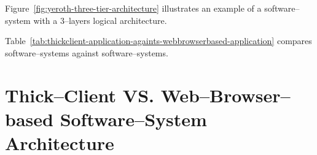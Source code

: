 Figure~\ref{fig:yeroth-three-tier-architecture}
illustrates an example of a \webbrowserbased
software--system with a $3$--layers
logical architecture.

Table~\ref{tab:thickclient-application-againts-webbrowserbased-application}
compares \thickclient software--systems against
\webbrowserbased software--systems.


\newpage


\section{Thick--Client VS. Web--Browser--based
	Software--System Architecture}



